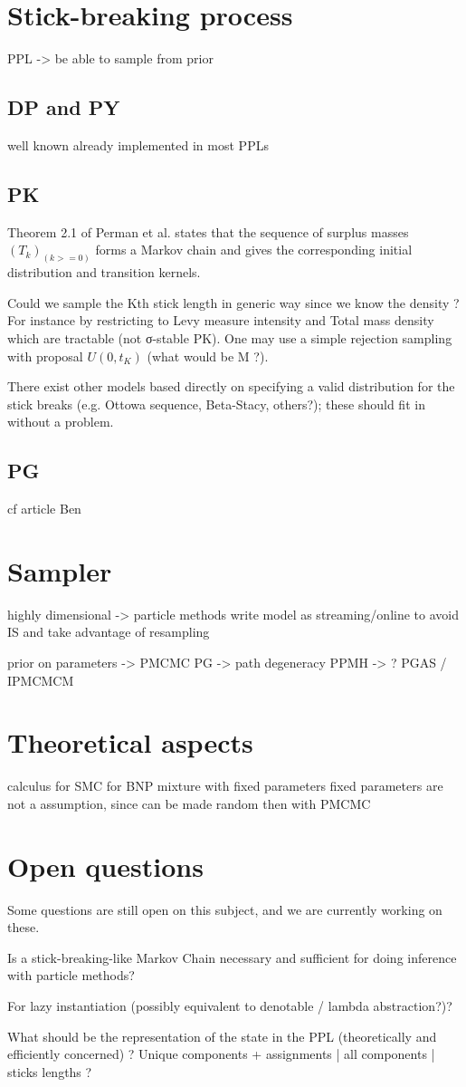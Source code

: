 \section{Stick-breaking process}
PPL -> be able to sample from prior

\subsection{DP and PY}
well known
already implemented in most \gls{PPL}s

\subsection{PK}
Theorem 2.1 of Perman et al. states that the sequence of surplus masses $(T_k)_(k>=0)$ forms a Markov chain and gives the corresponding initial distribution and transition kernels.

Could we sample the Kth stick length in generic way since we know the density ? For instance by restricting to Levy measure intensity and Total mass density which are tractable (not σ-stable PK). One may use a simple rejection sampling with proposal $U(0, t_K)$ (what would be M ?).

There exist other models based directly on specifying a valid distribution for the stick breaks (e.g. Ottowa sequence, Beta-Stacy, others?); these should fit in without a problem.

\subsection{PG}
cf article Ben

\section{Sampler}

highly dimensional -> particle methods
write model as streaming/online to avoid IS and take advantage of resampling

prior on parameters -> PMCMC
PG -> path degeneracy
PPMH -> ?
PGAS / IPMCMCM

\section{Theoretical aspects}
calculus for SMC for BNP mixture with fixed parameters
fixed parameters are not a assumption, since can be made random then with PMCMC

\section{Open questions}
Some questions are still open on this subject, and we are currently working on these.

Is a stick-breaking-like Markov Chain necessary and sufficient for doing inference with particle methods?

For lazy instantiation (possibly equivalent to denotable / lambda abstraction?)?

What should be the representation of the state in the PPL (theoretically and efficiently concerned) ? Unique components + assignments | all components | sticks lengths ?   
